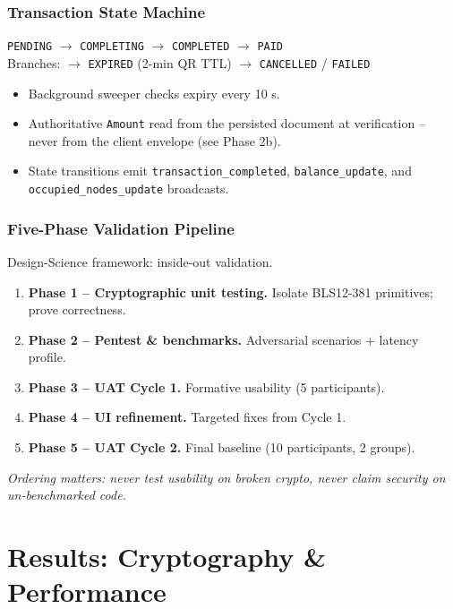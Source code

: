 \documentclass{beamer}
\newcommand{\HL}[1]{\textcolor{emphasis}{#1}}
\begin{document}
\begin{frame}
  \frametitle{Transaction State Machine}
  \begin{center}
    \small
    \texttt{PENDING} $\rightarrow$ \texttt{COMPLETING} $\rightarrow$ \texttt{COMPLETED} $\rightarrow$ \texttt{PAID} \\[4pt]
    {\scriptsize Branches: $\rightarrow$ \texttt{EXPIRED} (2-min QR TTL) \quad $\rightarrow$ \texttt{CANCELLED} / \texttt{FAILED}}
  \end{center}
  \vspace{0.15cm}
  \begin{itemize}
    \item Background sweeper checks expiry every 10 s.
    \item Authoritative \texttt{Amount} read from the persisted document at verification -- never from the client envelope (see Phase 2b).
    \item State transitions emit \texttt{transaction\_completed}, \texttt{balance\_update}, and \texttt{occupied\_nodes\_update} broadcasts.
  \end{itemize}
\end{frame}

\begin{frame}
  \frametitle{Five-Phase Validation Pipeline}
  Design-Science framework: \HL{inside-out validation}.
  \vspace{0.2cm}
  \begin{enumerate}
      \item \textbf{Phase 1 -- Cryptographic unit testing.} Isolate BLS12-381 primitives; prove correctness.
      \item \textbf{Phase 2 -- Pentest \& benchmarks.} Adversarial scenarios + latency profile.
      \item \textbf{Phase 3 -- UAT Cycle 1.} Formative usability (5 participants).
      \item \textbf{Phase 4 -- UI refinement.} Targeted fixes from Cycle 1.
      \item \textbf{Phase 5 -- UAT Cycle 2.} Final baseline (10 participants, 2 groups).
  \end{enumerate}
  \vspace{0.1cm}
  \textit{Ordering matters: never test usability on broken crypto, never claim security on un-benchmarked code.}
\end{frame}

\section{Results: Cryptography \& Performance}
\end{document}
